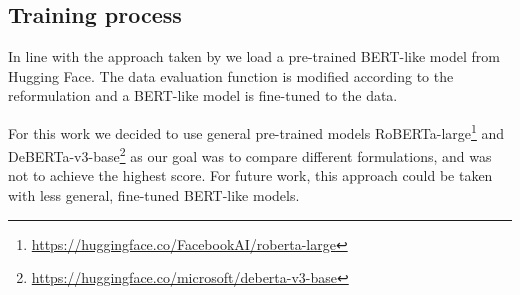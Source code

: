\subsection{Training process}
In line with the approach taken by \citep{ails-lab} we load a pre-trained BERT-like model from Hugging Face.
The data evaluation function is modified according to the reformulation and a BERT-like model is fine-tuned to the data.

For this work we decided to use general pre-trained models RoBERTa-large\footnote[4]{\url{https://huggingface.co/FacebookAI/roberta-large}} \citep{roberta} and DeBERTa-v3-base\footnote[5]{\url{https://huggingface.co/microsoft/deberta-v3-base}} \citep{deberta} as our goal was to compare different formulations, and was not to achieve the highest score.
For future work, this approach could be taken with less general, fine-tuned BERT-like models.

\pagebreak